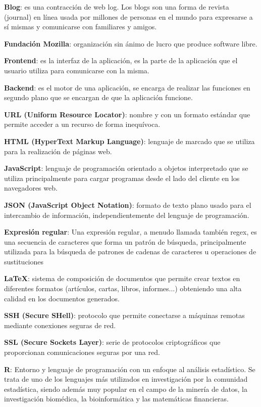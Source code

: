 \textbf{Blog}: es una contracción de web log. Los blogs son una forma de revista (journal) en línea usada por millones de personas en el mundo para expresarse a sí mismas y comunicarse con familiares y amigos.
\bigskip

\textbf{Fundación Mozilla}: organización sin ánimo de lucro que produce software libre.
\bigskip

\textbf{Frontend}: es la interfaz de la aplicación, es la parte de la aplicación que el usuario utiliza para comunicarse con la misma.
\bigskip

\textbf{Backend}: es el motor de una aplicación, se encarga de realizar las funciones en segundo plano que se encargan de que la aplicación funcione.
\bigskip

\textbf{URL (Uniform Resource Locator)}: nombre y con un formato estándar que permite acceder a un recurso de forma inequívoca.
\bigskip

\textbf{HTML (HyperText Markup Language)}: lenguaje de marcado que se utiliza para la realización de páginas web.
\bigskip

\textbf{JavaScript}: lenguaje de programación orientado a objetos interpretado que se utiliza principalmente para cargar programas desde el lado del cliente en los navegadores web.
\bigskip

\textbf{JSON (JavaScript Object Notation)}: formato de texto plano usado para el intercambio de información, independientemente del lenguaje de programación.
\bigskip

\textbf{Expresión regular}: Una expresión regular, a menudo llamada también regex, es una secuencia de caracteres que forma un patrón de búsqueda, principalmente utilizada para la búsqueda de patrones de cadenas de caracteres u operaciones de sustituciones
\bigskip

\textbf{LaTeX}: sistema de composición de documentos que permite crear textos en diferentes formatos (artículos, cartas, libros, informes...) obteniendo una alta calidad en los documentos generados.
\bigskip

\textbf{SSH (Secure SHell)}: protocolo que permite conectarse a máquinas remotas mediante conexiones seguras de red.
\bigskip

\textbf{SSL (Secure Sockets Layer)}: serie de protocolos criptográficos que proporcionan comunicaciones seguras por una red.
\bigskip

\textbf{R}: Entorno y lenguaje de programación con un enfoque al análisis estadístico. Se trata de uno de los lenguajes más utilizados en investigación por la comunidad estadística, siendo además muy popular en el campo de la minería de datos, la investigación biomédica, la bioinformática y las matemáticas financieras.
\bigskip

